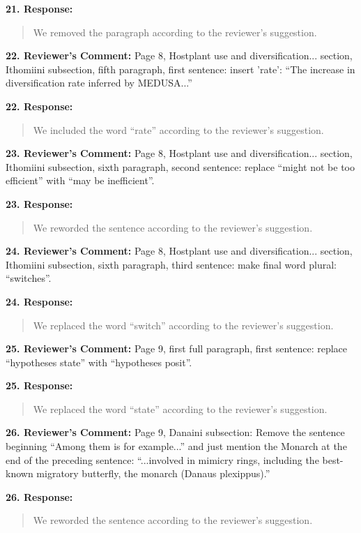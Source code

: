 \documentclass[]{article}
\begin{document}
\textbf{21. Response:}

\begin{quote}
\color{blue}
We removed the paragraph according to the reviewer's suggestion.
\end{quote}


\textbf{22. Reviewer's Comment:}
Page 8, Hostplant use and diversification... section, Ithomiini subsection,
fifth paragraph, first sentence: insert 'rate': “The increase in diversification
rate inferred by MEDUSA...”

\textbf{22. Response:}

\begin{quote}
\color{blue}
We included the word ``rate'' according to the reviewer's suggestion.
\end{quote}


\textbf{23. Reviewer's Comment:}
Page 8, Hostplant use and diversification... section, Ithomiini subsection,
sixth paragraph, second sentence: replace “might not be too efficient” with 
“may be inefficient”.

\textbf{23. Response:}

\begin{quote}
\color{blue}
We reworded the sentence according to the reviewer's suggestion.
\end{quote}


\textbf{24. Reviewer's Comment:}
Page 8, Hostplant use and diversification... section, Ithomiini subsection,
sixth paragraph, third sentence: make final word plural: “switches”.

\textbf{24. Response:}

\begin{quote}
\color{blue}
We replaced the word ``switch'' according to the reviewer's suggestion.
\end{quote}


\textbf{25. Reviewer's Comment:}
Page 9, first full paragraph, first sentence: replace “hypotheses state” with
“hypotheses posit”.

\textbf{25. Response:}

\begin{quote}
\color{blue}
We replaced the word ``state'' according to the reviewer's suggestion.
\end{quote}


\textbf{26. Reviewer's Comment:}
Page 9, Danaini subsection: Remove the sentence beginning “Among them is for
example...” and just mention the Monarch at the end of the preceding sentence:
“...involved in mimicry rings, including the best-known migratory butterfly,
the monarch (Danaus plexippus).”

\textbf{26. Response:}

\begin{quote}
\color{blue}
We reworded the sentence according to the reviewer's suggestion.
\end{quote}
\end{document}
